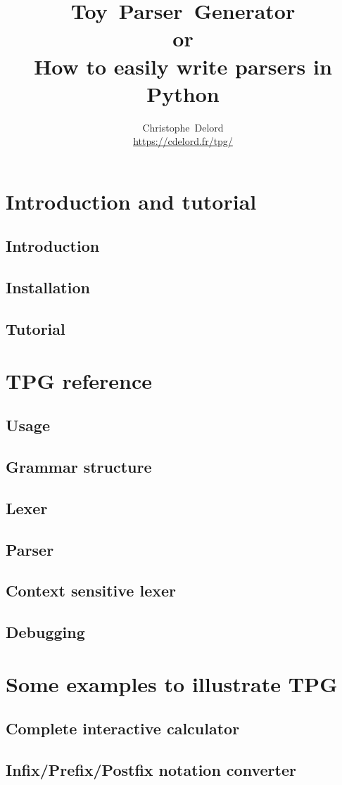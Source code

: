 \documentclass[a4paper,twoside]{report}
\author{
    Christophe~Delord\\
    \url{https://cdelord.fr/tpg/} \\
}
\title{
    Toy~Parser~Generator \\
    or\\
    How to easily write parsers in Python \\
}
\begin{document}
\maketitle
\tableofcontents

\listoffigures

\cleardoublepage
\part{Introduction and tutorial}                            \label{tpg:intro}
    \chapter{Introduction}
        
    \chapter{Installation}
        
    \chapter{Tutorial}                                      \label{tpg:tutorial}
        

\cleardoublepage
\part{TPG reference}                                        \label{tpg:core}
    \chapter{Usage}
        
    \chapter{Grammar structure}
        
    \chapter{Lexer}
        
    \chapter{Parser}
        
    \chapter{Context sensitive lexer}                       \label{tpg:CSL}
        
    \chapter{Debugging}
        

\cleardoublepage
\part{Some examples to illustrate TPG}                      \label{tpg:examples}
    \chapter{Complete interactive calculator}
        
    \chapter{Infix/Prefix/Postfix notation converter}
        
\end{document}
